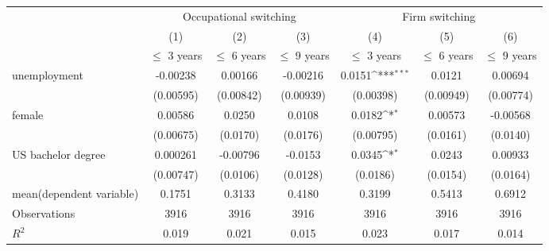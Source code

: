 \begin{table}[htbp]\centering
		\def\sym#1{\ifmmode^{#1}\else\(^{#1}\)\fi}
	\begin{adjustbox}{max width=1\textwidth}
			\begin{tabular}{l*{6}{c}}
				\hline\hline
				&\multicolumn{3}{c}{Occupational switching} & 			\multicolumn{3}{c}{Firm switching}\\
				&\multicolumn{1}{c}{(1)}&\multicolumn{1}{c}{(2)}&\multicolumn{1}{c}{(3)}&\multicolumn{1}{c}{(4)}&\multicolumn{1}{c}{(5)}&\multicolumn{1}{c}{(6)}\\
				&\multicolumn{1}{c}{$\le$ 3 years}&\multicolumn{1}{c}{$\le$ 6 years}&\multicolumn{1}{c}{$\le$ 9 years}&\multicolumn{1}{c}{$\le$ 3 years}&\multicolumn{1}{c}{$\le$ 6 years}&\multicolumn{1}{c}{$\le$ 9 years}\\
				\hline
				unemployment    &    -0.00238         &     0.00166         &    -0.00216         &      0.0151\sym{***}&      0.0121         &     0.00694         \\
				&   (0.00595)         &   (0.00842)         &   (0.00939)         &   (0.00398)         &   (0.00949)         &   (0.00774)         \\
				[1em]
				female  &     0.00586         &      0.0250         &      0.0108         &      0.0182\sym{*}  &     0.00573         &    -0.00568         \\
				&   (0.00675)         &    (0.0170)         &    (0.0176)         &   (0.00795)         &    (0.0161)         &    (0.0140)         \\
				[1em]
				US bachelor degree     &    0.000261         &    -0.00796         &     -0.0153         &      0.0345\sym{*}  &      0.0243         &     0.00933         \\
				&   (0.00747)         &    (0.0106)         &    (0.0128)         &    (0.0186)         &    (0.0154)         &    (0.0164)         \\
				\hline
				mean(dependent variable)   &        0.1751         &          0.3133       &        0.4180         &        0.3199         &        0.5413         &        0.6912         \\
				\hline
				Observations       &        3916         &        3916         &        3916         &        3916         &        3916         &        3916         \\
				\(R^{2}\)   &       0.019         &       0.021         &       0.015         &       0.023         &       0.017         &       0.014         \\

\end{tabular}
\end{adjustbox}
\end{table}

